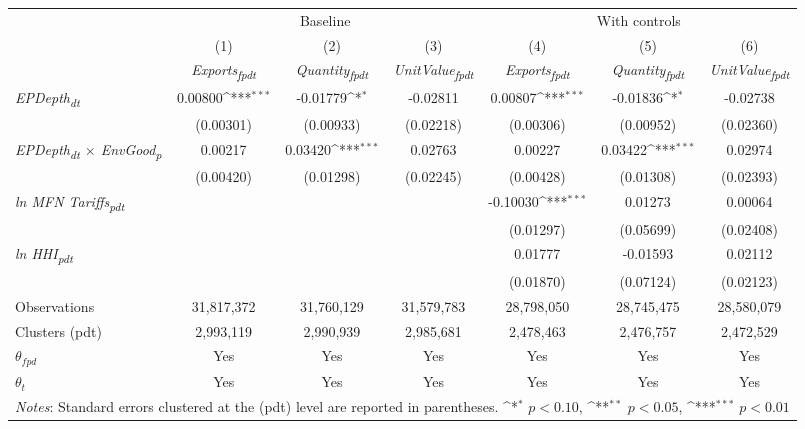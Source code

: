 {
\def\sym#1{\ifmmode^{#1}\else\(^{#1}\)\fi}
\begin{tabular}{l*{6}{c}}
\toprule
&\multicolumn{3}{c}{Baseline}&\multicolumn{3}{c}{With controls}\\\cmidrule(lr){2-4}\cmidrule(lr){5-7}
&(1)&(2)&(3)&(4)&(5)&(6)\\
&\textit{Exports\textsubscript{fpdt}}&\textit{Quantity\textsubscript{fpdt}}&\textit{UnitValue\textsubscript{fpdt}}&\textit{Exports\textsubscript{fpdt}}&\textit{Quantity\textsubscript{fpdt}}&\textit{UnitValue\textsubscript{fpdt}}\\
\midrule
\textit{EPDepth\textsubscript{dt}} & 0.00800\sym{***} & -0.01779\sym{*} & -0.02811 & 0.00807\sym{***} & -0.01836\sym{*} & -0.02738\\
  & (0.00301) & (0.00933) & (0.02218) & (0.00306) & (0.00952) & (0.02360)\\
\addlinespace
\textit{EPDepth\textsubscript{dt} $\times$ EnvGood\textsubscript{p}} & 0.00217 & 0.03420\sym{***} & 0.02763 & 0.00227 & 0.03422\sym{***} & 0.02974\\
  & (0.00420) & (0.01298) & (0.02245) & (0.00428) & (0.01308) & (0.02393)\\
\addlinespace
\textit{ln MFN Tariffs\textsubscript{pdt}} &  &  &  & -0.10030\sym{***} & 0.01273 & 0.00064\\
  &  &  &  & (0.01297) & (0.05699) & (0.02408)\\
\addlinespace
\textit{ln HHI\textsubscript{pdt}} &  &  &  & 0.01777 & -0.01593 & 0.02112\\
  &  &  &  & (0.01870) & (0.07124) & (0.02123)\\
\midrule
Observations & 31,817,372 & 31,760,129 & 31,579,783 & 28,798,050 & 28,745,475 & 28,580,079\\
Clusters (pdt) & 2,993,119 & 2,990,939 & 2,985,681 & 2,478,463 & 2,476,757 & 2,472,529\\
$\theta_{fpd}$ & Yes & Yes & Yes & Yes & Yes & Yes\\
$\theta_{t}$ & Yes & Yes & Yes & Yes & Yes & Yes\\
\bottomrule
\multicolumn{7}{l}{\footnotesize \textit{Notes}: Standard errors clustered at the (pdt) level are reported in parentheses. \sym{*} \(p<0.10\), \sym{**} \(p<0.05\), \sym{***} \(p<0.01\)}\\
\end{tabular}
}
